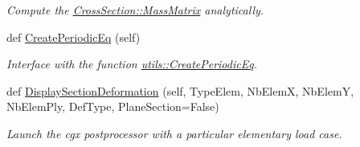 \begin{DoxyCompactItemize}
\begin{DoxyCompactList}\small\item\em Compute the \hyperlink{classgebtaero_1_1_cross_section_1_1_cross_section_ae9be8649853163b2b4dfdaa3584d9f78}{Cross\+Section\+::\+Mass\+Matrix} analytically. \end{DoxyCompactList}\item 
def \hyperlink{classgebtaero_1_1_composite_plate_1_1_composite_plate_a682fc7d2f0aca5dafbb381c95f437962}{Create\+Periodic\+Eq} (self)
\begin{DoxyCompactList}\small\item\em Interface with the function \hyperlink{namespacegebtaero_1_1utils_a4f786ecbe66af9f64c802adf4e0a990f}{utils\+::\+Create\+Periodic\+Eq}. \end{DoxyCompactList}\item 
def \hyperlink{classgebtaero_1_1_composite_plate_1_1_composite_plate_a4b6d1680426eb3db77f3860dbae58307}{Display\+Section\+Deformation} (self, Type\+Elem, Nb\+ElemX, Nb\+ElemY, Nb\+Elem\+Ply, Def\+Type, Plane\+Section=False)
\begin{DoxyCompactList}\small\item\em Launch the cgx postprocessor with a particular elementary load case. \end{DoxyCompactList}\end{DoxyCompactItemize}
